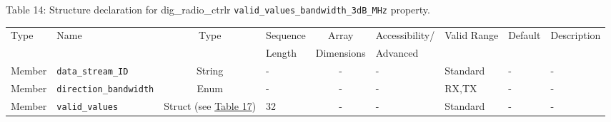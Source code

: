 \documentclass{article}
\def\comp{dig\_radio\_ctrlr}
\begin{document}
\begin{landscape}
	\noindent Table \hypertarget{tab14}{14}: Structure declaration for \comp{} \verb+valid_values_bandwidth_3dB_MHz+ property.
	\begin{scriptsize}
		\noindent\begin{longtable}{|p{1.8cm}|p{3.6cm}|c|p{2cm}|c|p{2cm}|p{1.7cm}|p{0.8cm}|p{4.97cm}|}
			\hline
			\rowcolor{blue}
			Type         & Name                                & Type & Sequence & Array      & Accessibility/ & Valid Range  & Default & Description                                                                                                                                                                                                                       \\
			\rowcolor{blue}
			             &                                     &      & Length   & Dimensions & Advanced       &              &         &                                                                                                                                                                                                                             \\
			\hline
			Member       & \verb+data_stream_ID+               & String& -       & -          & -              & Standard     & -       & - \\
			\hline
			Member       & \verb+direction_bandwidth+          & Enum  & -       & -          & -              & RX,TX        & -       & - \\
			\hline
			Member       & \verb+valid_values+                 & Struct (see \hyperlink{tab17}{Table 17}) & 32      & -          & -              & Standard & -       & - \\
			\hline
		\end{longtable}
	\end{scriptsize}


\end{landscape}
\end{document}
